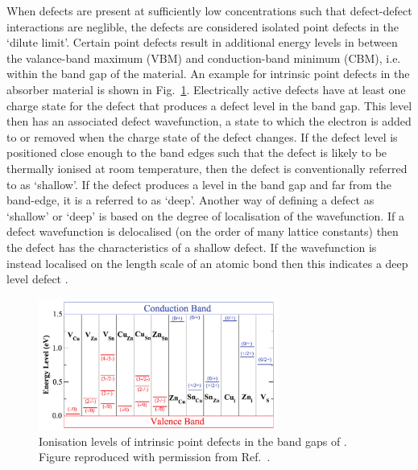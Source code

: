 \documentclass[11pt, twoside]{report}
\begin{document}
When defects are present at sufficiently low concentrations such that defect-defect interactions are neglible, the defects are considered isolated point defects in the `dilute limit'. Certain point defects result in additional energy levels in between the valance-band maximum (VBM) and conduction-band minimum (CBM), i.e. within the band gap of the material. An example for intrinsic point defects in the absorber material {\CZTS} is shown in Fig.~\ref{defects_CZTS}. Electrically active defects have at least one charge state for the defect that produces a defect level in the band gap. This level then has an associated defect wavefunction, a state to which the electron is added to or removed when the charge state of the defect changes. If the defect level is positioned close enough to the band edges such that the defect is likely to be thermally ionised at room temperature, then the defect is conventionally referred to as `shallow'. If the defect produces a level in the band gap and far from the band-edge, it is a referred to as `deep'.  Another way of defining a defect as `shallow' or `deep' is based on the degree of localisation of the wavefunction. If a defect wavefunction is delocalised (on the order of many lattice constants) then the defect has the characteristics of a shallow defect. If the wavefunction is instead localised on the length scale of an atomic bond then this indicates a deep level defect \cite{defects_tutorial}. 

\begin{figure}[h!]
  \centering
    \includegraphics[width=0.7\textwidth]{figures/Chen_CZTS_defects.png}
    \caption[Ionisation levels of intrinsic point defects in the band gaps of {\CZTS}]{Ionisation levels of intrinsic point defects in the band gaps of {\CZTS}. Figure reproduced with permission from Ref.~.}
  \label{defects_CZTS}
\end{figure}
\end{document}
